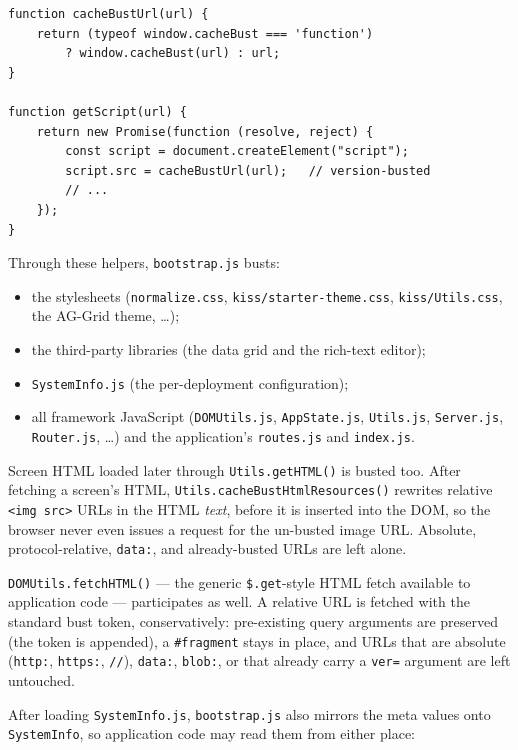 \begin{lstlisting}[style=javascript]
function cacheBustUrl(url) {
    return (typeof window.cacheBust === 'function')
        ? window.cacheBust(url) : url;
}

function getScript(url) {
    return new Promise(function (resolve, reject) {
        const script = document.createElement("script");
        script.src = cacheBustUrl(url);   // version-busted
        // ...
    });
}
\end{lstlisting}

\noindent
Through these helpers, \texttt{bootstrap.js} busts:

\begin{itemize}
  \item the stylesheets (\texttt{normalize.css}, \texttt{kiss/starter-theme.css}, \texttt{kiss/Utils.css}, the AG-Grid theme, \dots);
  \item the third-party libraries (the data grid and the rich-text editor);
  \item \texttt{SystemInfo.js} (the per-deployment configuration);
  \item all framework JavaScript (\texttt{DOMUtils.js}, \texttt{AppState.js}, \texttt{Utils.js}, \texttt{Server.js}, \texttt{Router.js}, \dots) and the application's \texttt{routes.js} and \texttt{index.js}.
\end{itemize}

\noindent
Screen HTML loaded later through \texttt{Utils.getHTML()} is busted too.  After fetching a screen's HTML, \texttt{Utils.cacheBustHtmlResources()} rewrites relative \texttt{<img src>} URLs in the HTML \emph{text}, before it is inserted into the DOM, so the browser never even issues a request for the un-busted image URL.  Absolute, protocol-relative, \texttt{data:}, and already-busted URLs are left alone.

\texttt{DOMUtils.fetchHTML()} --- the generic \texttt{\$.get}-style HTML fetch available to application code --- participates as well.  A relative URL is fetched with the standard bust token, conservatively: pre-existing query arguments are preserved (the token is appended), a \texttt{\#fragment} stays in place, and URLs that are absolute (\texttt{http:}, \texttt{https:}, \texttt{//}), \texttt{data:}, \texttt{blob:}, or that already carry a \texttt{ver=} argument are left untouched.

After loading \texttt{SystemInfo.js}, \texttt{bootstrap.js} also mirrors the meta values onto \texttt{SystemInfo}, so application code may read them from either place:

